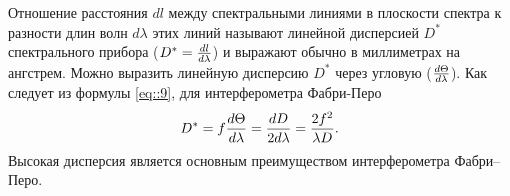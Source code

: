Отношение расстояния $dl$ между спектральными линиями в плоскости спектра
к разности длин волн $d\lambda$ этих линий называют линейной дисперсией
$D^*$ спектрального прибора ($D^* = \frac{d l}{d \lambda}$) и выражают 
обычно в миллиметрах на ангстрем. Можно выразить линейную дисперсию
$D^*$ через угловую ($\frac{d \Theta}{d \lambda}$). 
Как следует из формулы \eqref{eq::9}, для интерферометра Фабри-Перо
$$
D^* = f \frac{d \Theta}{d \lambda} = 
\frac{dD}{2d\lambda} = \frac{2f^2}{\lambda D}.
$$
\noindent Высокая дисперсия является основным преимуществом интерферометра Фабри–Перо.